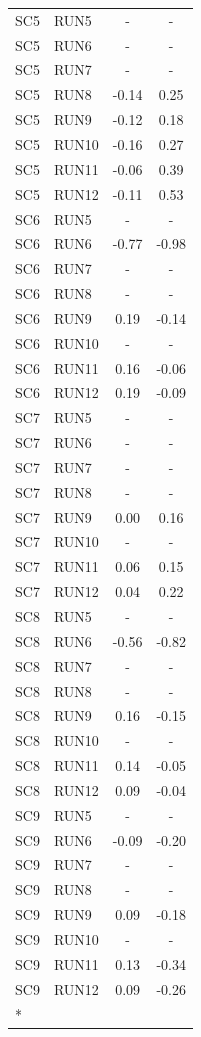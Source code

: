 \documentclass[
  12pt,
]{article}
\begin{document}
\begin{longtable}[t]{llcc}
\endfoot
\bottomrule
\endlastfoot
SC5 & RUN5 & - & -\\
SC5 & RUN6 & - & -\\
SC5 & RUN7 & - & -\\
SC5 & RUN8 & -0.14 & 0.25\\
SC5 & RUN9 & -0.12 & 0.18\\
\addlinespace
SC5 & RUN10 & -0.16 & 0.27\\
SC5 & RUN11 & -0.06 & 0.39\\
SC5 & RUN12 & -0.11 & 0.53\\
SC6 & RUN5 & - & -\\
SC6 & RUN6 & -0.77 & -0.98\\
\addlinespace
SC6 & RUN7 & - & -\\
SC6 & RUN8 & - & -\\
SC6 & RUN9 & 0.19 & -0.14\\
SC6 & RUN10 & - & -\\
SC6 & RUN11 & 0.16 & -0.06\\
\addlinespace
SC6 & RUN12 & 0.19 & -0.09\\
SC7 & RUN5 & - & -\\
SC7 & RUN6 & - & -\\
SC7 & RUN7 & - & -\\
SC7 & RUN8 & - & -\\
\addlinespace
SC7 & RUN9 & 0.00 & 0.16\\
SC7 & RUN10 & - & -\\
SC7 & RUN11 & 0.06 & 0.15\\
SC7 & RUN12 & 0.04 & 0.22\\
SC8 & RUN5 & - & -\\
\addlinespace
SC8 & RUN6 & -0.56 & -0.82\\
SC8 & RUN7 & - & -\\
SC8 & RUN8 & - & -\\
SC8 & RUN9 & 0.16 & -0.15\\
SC8 & RUN10 & - & -\\
\addlinespace
SC8 & RUN11 & 0.14 & -0.05\\
SC8 & RUN12 & 0.09 & -0.04\\
SC9 & RUN5 & - & -\\
SC9 & RUN6 & -0.09 & -0.20\\
SC9 & RUN7 & - & -\\
\addlinespace
SC9 & RUN8 & - & -\\
SC9 & RUN9 & 0.09 & -0.18\\
SC9 & RUN10 & - & -\\
SC9 & RUN11 & 0.13 & -0.34\\
SC9 & RUN12 & 0.09 & -0.26\\*
\end{longtable}
\endgroup{}
\end{document}
